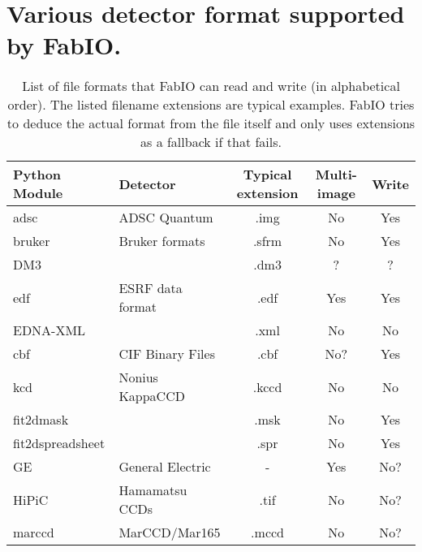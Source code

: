 \documentclass[preprint ]{iucr}
\begin{document}
\section{Various detector format supported by FabIO.}
\onecolumn
\begin{table}
\label{format}
\caption{List of file formats that FabIO can read and write (in
alphabetical order). The listed filename extensions are typical examples.
FabIO tries to deduce the actual format from the file itself and only
uses extensions as a fallback if that fails.}
\vspace{1mm}
\begin{center}
\begin{tabular}{llccc}
Python Module   & Detector		& Typical extension & Multi-image	& Write\\%
\midrule
adsc	   &   ADSC Quantum		&	.img	&	No	&	Yes		\\%
bruker		&   Bruker formats		&	.sfrm	&	No	&	Yes		\\%
DM3			&						&	.dm3	&	?	&	?		\\%
edf		    &   ESRF data format	&	.edf	&	Yes	&	Yes		\\%
EDNA-XML \cite{edna}	& &	.xml	&	No		&	No	 \\%
cbf		    &   CIF Binary Files	&	.cbf	&	No?	& 	Yes		\\%
kcd	    	&   Nonius 	KappaCCD	&	.kccd	&	No 	&	No		\\%
fit2dmask \cite{fit2d} 	&			&   .msk    &   No  &   Yes  \\
fit2dspreadsheet \cite{fit2d}	&  	&  .spr    &   No  &   Yes    \\
GE		    &   General Electric	&	-		&	Yes	&	No?		\\%
HiPiC       & Hamamatsu CCDs 		&	.tif	&	No	&	No?	 	\\%
marccd		&   MarCCD/Mar165		&	.mccd	&	No	&	No?		\\%

\end{tabular}
\end{center}
\end{table}
\end{document}
